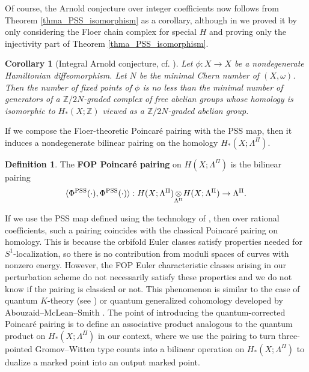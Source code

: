 \documentclass[reqno, 10pt]{amsart}
\numberwithin{equation}{section}
\numberwithin{equation}{section}
\newtheorem{cor}[thm]{Corollary}
\theoremstyle{definition}
\newtheorem{defn}[thm]{Definition}
\theoremstyle{remark}
\newcommand{\beqn}{\begin{equation*}}
\newcommand{\eeqn}{\end{equation*}}
\newcommand{\mb}{\mathbb}
\begin{document}
Of course, the Arnold conjecture over integer coefficients now follows from Theorem \ref{thma_PSS_isomorphism} as a corollary, although in \cite{Bai_Xu_Arnold} we proved it by only considering the Floer chain complex for special $H$ and proving only the injectivity part of Theorem \ref{thma_PSS_isomorphism}.

\begin{cor}[Integral Arnold conjecture, cf. \cite{Bai_Xu_Arnold}]
Let $\phi: X \to X$ be a nondegenerate Hamiltonian diffeomorphism. Let $N$ be the minimal Chern number of $(X, \omega)$. Then the number of fixed points of $\phi$ is no less than the minimal number of generators of a ${\mb Z}/2N$-graded complex of free abelian groups whose homology is isomorphic to $H_*(X; {\mb Z})$ viewed as a ${\mb Z}/2N$-graded abelian group.
\end{cor}


If we compose the Floer-theoretic Poincar\'e pairing with the PSS map, then it induces a nondegenerate bilinear pairing on the homology $H_*(X; \Lambda^\Pi)$. 

\begin{defn}
The {\bf FOP Poincar\'e pairing} on $H(X; \Lambda^\Pi)$ is the bilinear pairing
\beqn
\langle \Phi^{\rm PSS} (\cdot), \Phi^{\rm PSS} (\cdot) \rangle: H (X; \Lambda^\Pi) {\underset{\Lambda^\Pi}{\otimes}}  H (X; \Lambda^\Pi) \to \Lambda^\Pi.
\eeqn
\end{defn}

If we use the PSS map defined using the technology of \cite{Fukaya_Ono}\cite{Liu_Tian_Floer}\cite{Pardon_virtual}, then over rational coefficients, such a pairing coincides with the classical Poincar\'e pairing on homology. This is because the orbifold Euler classes satisfy properties needed for $S^1$-localization, so there is no contribution from moduli spaces of curves with nonzero energy. However, the FOP Euler characteristic classes arising in our perturbation scheme do not necessarily satisfy these properties and we do not know if the pairing is classical or not. This phenomenon is similar to the case of quantum $K$-theory (see \cite{Lee-K}) or quantum generalized cohomology developed by Abouzaid--McLean--Smith \cite{AMS2}. The point of introducing the quantum-corrected Poincar\'e pairing is to define an associative product analogous to the quantum product on $H_*(X; \Lambda^\Pi)$ in our context, where we use the pairing to turn three-pointed Gromov--Witten type counts into a bilinear operation on $H_*(X; \Lambda^\Pi)$ to dualize a marked point into an output marked point.
\end{document}
